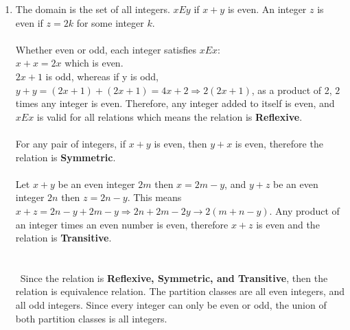 \documentclass{amsart}
\theoremstyle{definition}
\theoremstyle{Exercise}
\theoremstyle{remark}
\theoremstyle{rule}
\numberwithin{equation}{section}
\begin{document}
\begin{enumerate}[label=(\alph*)]
\item The domain is the set of all integers. $xEy$ if $x + y$ is even. An integer $z$ is even if $z = 2k$ for some integer $k$.\\\\
Whether even or odd, each integer satisfies $xEx$:\\
$x+x = 2x$ which is even.\\
$2x+1$ is odd, whereas if y is odd, $y+y = (2x+1)+(2x+1) = 4x+2 \Rightarrow 2(2x+1)$, as a product of 2, $2$ times any integer is even. Therefore, any integer added to itself is even, and $xEx$ is valid for all relations which means the relation is \textbf{Reflexive}.\\\\
For any pair of integers, if $x+y$ is even, then $y+x$ is even, therefore the relation is \textbf{Symmetric}.\\\\
Let $x+y$ be an even integer $2m$ then $x=2m-y$, and $y+z$ be an even integer $2n$ then $z=2n-y$. This means $x+z=2n-y+2m-y \Rightarrow 2n+2m-2y \rightarrow 2(m+n-y)$. Any product of an integer times an even number is even, therefore $x+z$ is even and the relation is \textbf{Transitive}.\\
\vspace*{0.1in}
\\\\\
Since the relation is \textbf{Reflexive, Symmetric, and Transitive}, then the relation is equivalence relation. The partition classes are all even integers, and all odd integers. Since every integer can only be even or odd, the union of both partition classes is all integers.
\\\\

\end{enumerate}
\end{document}
